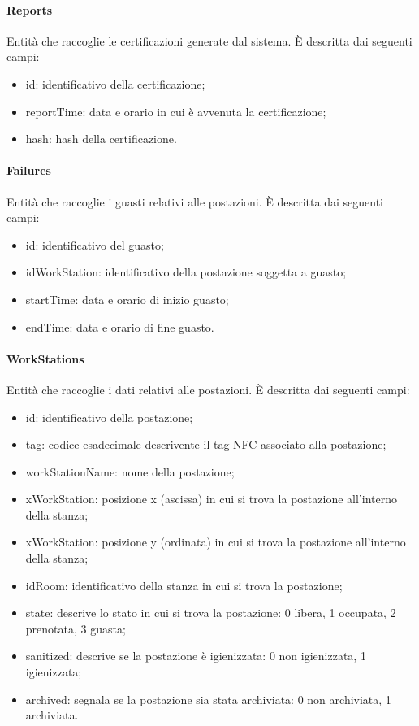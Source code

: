 \paragraph{Reports}
Entità che raccoglie le certificazioni generate dal sistema. È descritta dai seguenti campi:
\begin{itemize}
	\item id: identificativo della certificazione;
	\item reportTime: data e orario in cui è avvenuta la certificazione;
	\item hash: hash della certificazione.
\end{itemize}

\paragraph{Failures}
Entità che raccoglie i guasti relativi alle postazioni. È descritta dai seguenti campi:
\begin{itemize}
	\item id: identificativo del guasto;
	\item idWorkStation: identificativo della postazione soggetta a guasto;
	\item startTime: data e orario di inizio guasto;
	\item endTime: data e orario di fine guasto.
\end{itemize}

\paragraph{WorkStations}
Entità che raccoglie i dati relativi alle postazioni. È descritta dai seguenti campi:
\begin{itemize}
	\item id: identificativo della postazione;
	\item tag: codice esadecimale descrivente il tag NFC associato alla postazione;
	\item workStationName: nome della postazione;
	\item xWorkStation: posizione x (ascissa) in cui si trova la postazione all'interno della stanza;
	\item xWorkStation: posizione y (ordinata) in cui si trova la postazione all'interno della stanza;
	\item idRoom: identificativo della stanza in cui si trova la postazione;
	\item state: descrive lo stato in cui si trova la postazione: 0 libera, 1 occupata, 2 prenotata, 3 guasta;
	\item sanitized: descrive se la postazione è igienizzata: 0 non igienizzata, 1 igienizzata; 
	\item archived: segnala se la postazione sia stata archiviata: 0 non archiviata, 1 archiviata.
\end{itemize}

